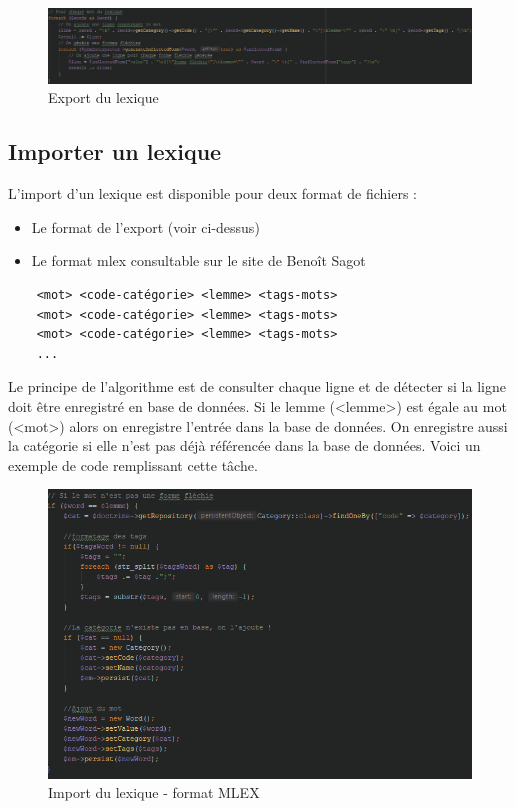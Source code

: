 \documentclass[12pt,a4paper]{article}
\begin{document}
\begin{figure}[h]
\centering
\includegraphics[width=150mm]{img/exportLexique.PNG}
\caption{Export du lexique}
\label{Export}
\end{figure}

\subsection{Importer un lexique}

L'import d'un lexique est disponible pour deux format de fichiers : 
\begin{itemize}
  \item Le format de l'export (voir ci-dessus)
  \item Le format mlex consultable sur le site de Benoît Sagot
\end{itemize}
\begin{verbatim}
    <mot> <code-catégorie> <lemme> <tags-mots>
    <mot> <code-catégorie> <lemme> <tags-mots>
    <mot> <code-catégorie> <lemme> <tags-mots>
    ...
\end{verbatim}

Le principe de l'algorithme est de consulter chaque ligne et de détecter si la ligne doit être enregistré en base de données. Si le lemme (<lemme>) est égale au mot (<mot>) alors on enregistre l'entrée dans la base de données.
On enregistre aussi la catégorie si elle n'est pas déjà référencée dans la base de données.
Voici un exemple de code remplissant cette tâche.

\begin{figure}[h]
\centering
\includegraphics[width=150mm]{img/import_mlex.PNG}
\caption{Import du lexique - format MLEX}
\label{Import}
\end{figure}
\end{document}
